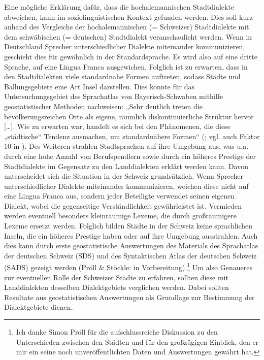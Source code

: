 Eine mögliche Erklärung dafür, dass die hochalemannischen Stadtdialekte abweichen, kann im soziolinguistischen Kontext gefunden werden. Dies soll kurz anhand des Vergleichs der hochalemannischen (= Schweizer) Stadtdialekte mit dem schwäbischen (= deutschen) Stadtdialekt veranschaulicht werden. Wenn in Deutschland Sprecher unterschiedlicher Dialekte miteinander kommunizieren, geschieht dies für gewöhnlich in der Standardsprache. Es wird also auf eine dritte Sprache, auf eine Lingua Franca ausgewichen. Folglich ist zu erwarten, dass in den Stadtdialekten viele standardnahe Formen auftreten, sodass Städte und Ballungsgebiete eine Art Insel darstellen. Dies konnte \citet{Pröll2015} für das Untersuchungsgebiet des Sprachatlas von Bayerisch-Schwaben mithilfe geostatistischer Methoden nachweisen: „Sehr deutlich treten die bevölkerungsreichen Orte als eigene, räumlich diskontinuierliche Struktur hervor […]. Wie zu erwarten war, handelt es sich bei den Phänomenen, die diese „städtische“ Tendenz ausmachen, um standardnähere Formen“ (\citealt[160]{Pröll2015}; vgl. auch Faktor 10 in \citealt[146-147]{Pröll2015}). Des Weiteren strahlen Stadtsprachen auf ihre Umgebung aus, was u.a. durch eine hohe Anzahl von Berufspendlern sowie durch ein höheres Prestige der Stadtdialekte im Gegensatz zu den Landdialekten erklärt werden kann. Davon unterscheidet sich die Situation in der Schweiz grundsätzlich. Wenn Sprecher unterschiedlicher Dialekte miteinander kommunizieren, weichen diese nicht auf eine Lingua Franca aus, sondern jeder Beteiligte verwendet seinen eigenen Dialekt, wobei die gegenseitige Verständlichkeit gewährleistet ist. Vermieden werden eventuell besonders kleinräumige Lexeme, die durch großräumigere Lexeme ersetzt werden. Folglich bilden Städte in der Schweiz keine sprachlichen Inseln, die ein höheres Prestige haben oder auf ihre Umgebung ausstrahlen. Auch dies kann durch erste geostatistische Auswertungen des Materials des Sprachatlas der deutschen Schweiz (SDS) und des Syntaktischen Atlas der deutschen Schweiz (SADS) gezeigt werden (Pröll \& Stöckle: in Vorbereitung).\footnote{Ich danke Simon Pröll für die aufschlussreiche Diskussion zu den Unterschieden zwischen den Städten und für den großzügigen Einblick, den er mir ein seine noch unveröffentlichten Daten und Auswertungen gewährt hat.} Um also Genaueres zur eventuellen Rolle der Schweizer Städte zu erfahren, sollten diese mit Landdialekten desselben Dialektgebiets verglichen werden. Dabei sollten Resultate aus geostatistischen Auswertungen als Grundlage zur Bestimmung der Dialektgebiete dienen.

